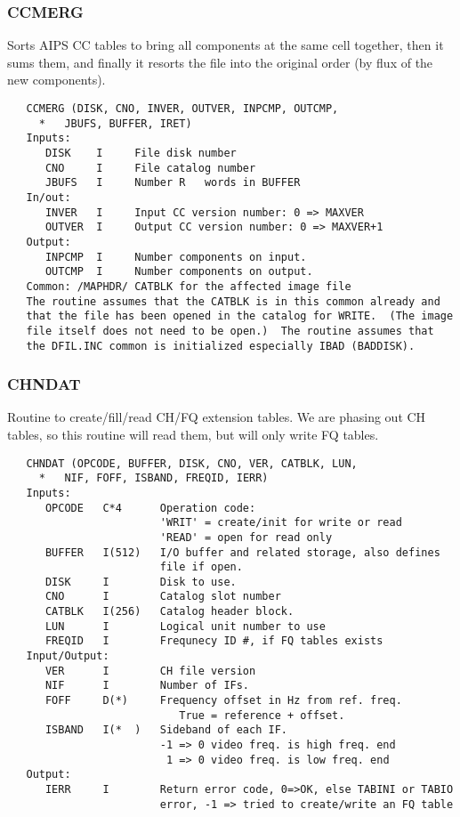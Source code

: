\subsubsection{CCMERG}
Sorts AIPS CC tables to bring all components at the same
cell together, then it sums them, and finally it resorts the file
into the original order (by flux of the new components).
\begin{verbatim}
   CCMERG (DISK, CNO, INVER, OUTVER, INPCMP, OUTCMP,
     *   JBUFS, BUFFER, IRET)
   Inputs:
      DISK    I     File disk number
      CNO     I     File catalog number
      JBUFS   I     Number R   words in BUFFER
   In/out:
      INVER   I     Input CC version number: 0 => MAXVER
      OUTVER  I     Output CC version number: 0 => MAXVER+1
   Output:
      INPCMP  I     Number components on input.
      OUTCMP  I     Number components on output.
   Common: /MAPHDR/ CATBLK for the affected image file
   The routine assumes that the CATBLK is in this common already and
   that the file has been opened in the catalog for WRITE.  (The image
   file itself does not need to be open.)  The routine assumes that
   the DFIL.INC common is initialized especially IBAD (BADDISK).
\end{verbatim}

\subsubsection{CHNDAT}
Routine to create/fill/read CH/FQ extension tables.
We are phasing out CH tables, so this routine will read them, but
will only write FQ tables.
\begin{verbatim}
   CHNDAT (OPCODE, BUFFER, DISK, CNO, VER, CATBLK, LUN,
     *   NIF, FOFF, ISBAND, FREQID, IERR)
   Inputs:
      OPCODE   C*4      Operation code:
                        'WRIT' = create/init for write or read
                        'READ' = open for read only
      BUFFER   I(512)   I/O buffer and related storage, also defines
                        file if open.
      DISK     I        Disk to use.
      CNO      I        Catalog slot number
      CATBLK   I(256)   Catalog header block.
      LUN      I        Logical unit number to use
      FREQID   I        Frequnecy ID #, if FQ tables exists
   Input/Output:
      VER      I        CH file version
      NIF      I        Number of IFs.
      FOFF     D(*)     Frequency offset in Hz from ref. freq.
                           True = reference + offset.
      ISBAND   I(*  )   Sideband of each IF.
                        -1 => 0 video freq. is high freq. end
                         1 => 0 video freq. is low freq. end
   Output:
      IERR     I        Return error code, 0=>OK, else TABINI or TABIO
                        error, -1 => tried to create/write an FQ table
\end{verbatim}

